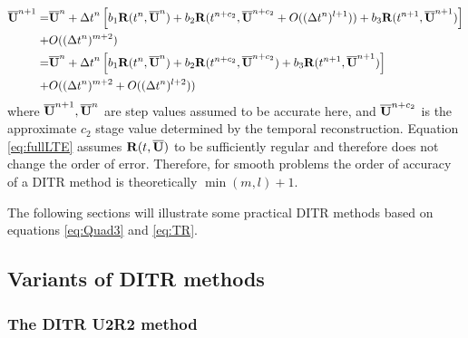 \begin{equation}
    \begin{aligned}
        \overline{\mathbf{U}}^{n+1} = & \overline{\mathbf{U}}^{n} + {{\Delta} t}^{n}
        \left[
            b_1\mathbf{R}(t^n, \overline{\mathbf{U}}^n)
            +
            b_2\mathbf{R}(t^{n+c_2}, \overline{\mathbf{U}}^{n+c_2} + O(({\Delta} t^{n})^{l+1} ))
            +
            b_3\mathbf{R}(t^{n+1}, \overline{\mathbf{U}}^{n+1})
            \right]
        \\ + &
        O(({\Delta} t^{n})^{m+2} )               \\
        =           &
        \overline{\mathbf{U}}^{n} + {{\Delta} t}^{n}
        \left[
            b_1\mathbf{R}(t^n, \overline{\mathbf{U}}^n)
            +
            b_2\mathbf{R}(t^{n+c_2}, \overline{\mathbf{U}}^{n+c_2})
            +
            b_3\mathbf{R}(t^{n+1}, \overline{\mathbf{U}}^{n+1})
            \right]
        \\ + &
        O(({\Delta} t^{n})^{m+2}  + O(({\Delta} t^{n})^{l+2} ))
    \end{aligned}
    \label{eq:fullLTE}
\end{equation}
where $\overline{\mathbf{U}}^{n+1}, \overline{\mathbf{U}}^{n}$ are step values assumed to be accurate here, and
$\overline{\mathbf{U}}^{n+c_2}$ is the approximate
$c_2$ stage value determined by the temporal reconstruction.
Equation \eqref{eq:fullLTE} assumes
$\mathbf{R}(t, \overline{\mathbf{U}})$ to be sufficiently regular and therefore does not
change the order of error.
Therefore, for smooth problems the
order of accuracy of a DITR
method is theoretically $\min(m,l) + 1$.

The following sections will illustrate some
practical DITR methods based on equations \eqref{eq:Quad3} and \eqref{eq:TR}.


\subsection{Variants of DITR methods}



\subsubsection{The DITR U2R2 method}

